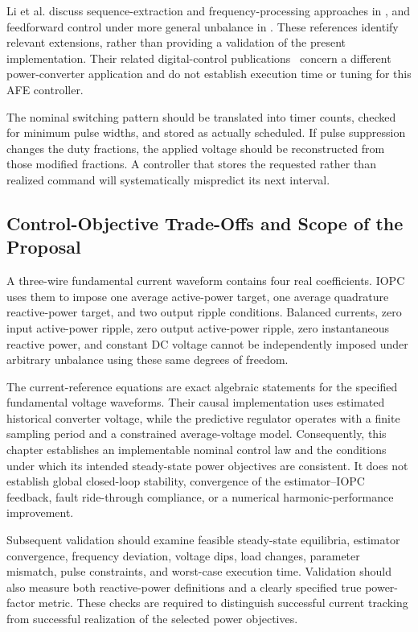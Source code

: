 Li et al. discuss sequence-extraction and frequency-processing approaches in \cite{ch5-santos2009,ch5-yazdani2009,ch5-timbus2006}, and feedforward control under more general unbalance in \cite{ch5-stankovic2009}. These references identify relevant extensions, rather than providing a validation of the present implementation. Their related digital-control publications~\cite{ch5-li2008gpu,ch5-li2010gpu} concern a different power-converter application and do not establish execution time or tuning for this AFE controller.

The nominal switching pattern should be translated into timer counts, checked for minimum pulse widths, and stored as actually scheduled. If pulse suppression changes the duty fractions, the applied voltage should be reconstructed from those modified fractions. A controller that stores the requested rather than realized command will systematically mispredict its next interval.

\subsection{Control-Objective Trade-Offs and Scope of the Proposal}
A three-wire fundamental current waveform contains four real coefficients. IOPC uses them to impose one average active-power target, one average quadrature reactive-power target, and two output ripple conditions. Balanced currents, zero input active-power ripple, zero output active-power ripple, zero instantaneous reactive power, and constant DC voltage cannot be independently imposed under arbitrary unbalance using these same degrees of freedom.

The current-reference equations are exact algebraic statements for the specified fundamental voltage waveforms. Their causal implementation uses estimated historical converter voltage, while the predictive regulator operates with a finite sampling period and a constrained average-voltage model. Consequently, this chapter establishes an implementable nominal control law and the conditions under which its intended steady-state power objectives are consistent. It does not establish global closed-loop stability, convergence of the estimator--IOPC feedback, fault ride-through compliance, or a numerical harmonic-performance improvement.

Subsequent validation should examine feasible steady-state equilibria, estimator convergence, frequency deviation, voltage dips, load changes, parameter mismatch, pulse constraints, and worst-case execution time. Validation should also measure both reactive-power definitions and a clearly specified true power-factor metric. These checks are required to distinguish successful current tracking from successful realization of the selected power objectives.
